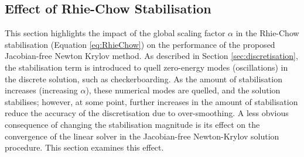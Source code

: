 \documentclass[sn-mathphys,Numbered]{sn-jnl}%
\begin{document}
\subsection{Effect of Rhie-Chow Stabilisation} \label{sec:RhieChowResults}
This section highlights the impact of the global scaling factor $\alpha$ in the Rhie-Chow stabilisation (Equation \ref{eq:RhieChow}) on the performance of the proposed Jacobian-free Newton Krylov method.
As described in Section \ref{sec:discretisation}, the stabilisation term is introduced to quell zero-energy modes (oscillations) in the discrete solution, such as checkerboarding.
As the amount of stabilisation increases (increasing $\alpha$), these numerical modes are quelled, and the solution stabilises; however, at some point, further increases in the amount of stabilisation reduce the accuracy of the discretisation due to over-smoothing.
A less obvious consequence of changing the stabilisation magnitude is its effect on the convergence of the linear solver in the Jacobian-free Newton-Krylov solution procedure.
This section examines this effect.
\end{document}
